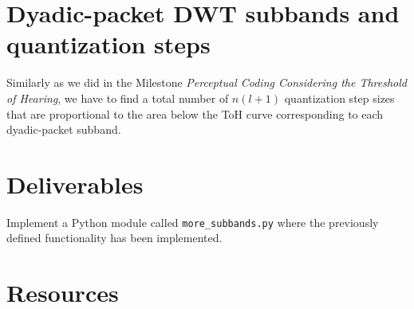 \section{Dyadic-packet DWT subbands and quantization steps}

Similarly as we did in the Milestone \emph{Perceptual Coding
  Considering the Threshold of Hearing}, we have to find a total
number of $n(l+1)$ quantization step sizes that are proportional to
the area below the ToH curve corresponding to each dyadic-packet
subband.

\section{Deliverables}

Implement a Python module called \verb|more_subbands.py| where the
previously defined functionality has been implemented.

\section{Resources}



